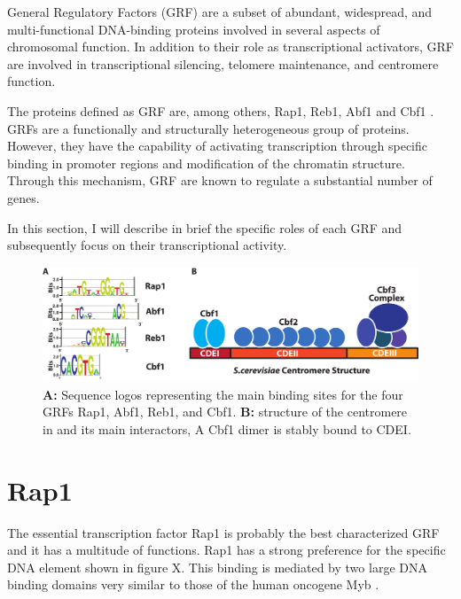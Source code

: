 General Regulatory Factors (GRF) are a subset of abundant, widespread, and multi-functional DNA-binding proteins involved in several aspects of chromosomal function. 
In addition to their role as transcriptional activators, GRF are involved in transcriptional silencing, telomere maintenance, and centromere function.

The proteins defined as GRF are, among others, Rap1, Reb1, Abf1 and Cbf1 \cite{diffley:1992:global}. 
GRFs are a functionally and structurally heterogeneous group of proteins. 
However, they have the capability of activating transcription through specific binding in promoter regions and modification of the chromatin structure. 
Through this mechanism, GRF are known to regulate a substantial number of genes.

In this section, I will describe in brief the specific roles of each GRF and subsequently focus on their transcriptional activity.

\begin{figure}[ht]

\centering
\includegraphics[width=\textwidth]{figures/introduction/grfCentromere}
\caption[GRFs binding sites and \cer{} centromere structure]{\textbf{A:} Sequence logos representing the main binding sites for the four GRFs Rap1, Abf1, Reb1, and Cbf1. \textbf{B:} structure of the centromere in \cer{} and its main interactors, A Cbf1 dimer is stably bound to CDEI.}
\label{fig:grfCentromere}

\end{figure}

\section{Rap1}

The essential transcription factor Rap1 is probably the best characterized GRF and it has a multitude of functions. 
Rap1 has a strong preference for the specific DNA element shown in figure X. This binding is mediated by two large DNA binding domains very similar to those of the human oncogene Myb \cite{rhee:2011:comprehensive}. 

